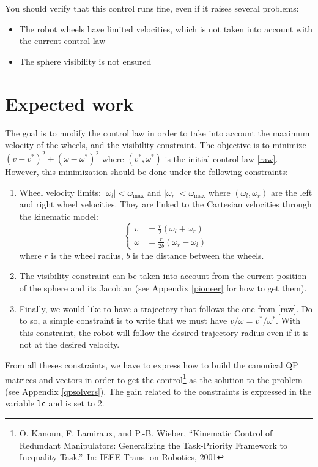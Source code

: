 \documentclass{ecnreport}
\begin{document}
You should verify that this control runs fine, even if it raises several problems:
\begin{itemize}
 \item The robot wheels have limited velocities, which is not taken into account with the current control law
 \item The sphere visibility is not ensured
\end{itemize}


\section{Expected work}

The goal is to modify the control law in order to take into account the maximum velocity of the wheels, and the visibility constraint.
The objective is to minimize $(v-v^*)^2 + (\omega-\omega^*)^2$ where $(v^*,\omega^*)$ is the initial control law \eqref{raw}.
However, this minimization should be done under the following constraints:

\begin{enumerate}
 \item Wheel velocity limits: $|\omega_l| < \omega_{\max}$ and $|\omega_r| < \omega_{\max}$ where $(\omega_l, \omega_r)$ are the left and right wheel velocities. 
 They are linked to the Cartesian velocities through the kinematic model:
\begin{equation}
  \left\{\begin{array}{ll}
         v &= \frac{r}{2}(\omega_l + \omega_r) \\ \omega &=  \frac{r}{2b}(\omega_r - \omega_l)
        \end{array}\right.
\end{equation}where $r$ is the wheel radius, $b$ is the distance between the wheels.
\item The visibility constraint can be taken into account from the current position of the sphere and its Jacobian (see Appendix \ref{pioneer} for how to get them).
\item Finally, we would like to have a trajectory that follows the one from \eqref{raw}. Do to so, a simple constraint is to write that we must have $v/\omega = v^*/\omega^*$. With this constraint, 
the robot will follow the desired trajectory radius even if it is not at the desired velocity.
\end{enumerate}
From all theses constraints, we have to express how to build the canonical QP matrices and vectors in order to get the control\footnote{ O. Kanoun, F. Lamiraux, and P.-B. Wieber, “Kinematic Control of
	Redundant Manipulators: Generalizing the Task-Priority Framework to Inequality
	Task.”. In: IEEE Trans. on Robotics, 2001} as the solution to the problem (see Appendix \ref{qpsolvers}).
The gain related to the constraints is expressed in the variable \texttt{lc} and is set to 2.
\end{document}
